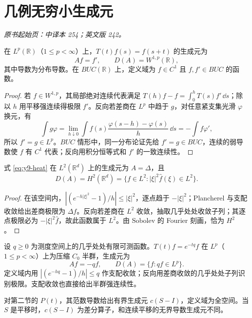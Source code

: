 \section{几例无穷小生成元}\label{sec:yosida-09-05}
\noindent\textit{原书起始页：中译本 254；英文版 242。}

\begin{proposition}[平移的生成元]\label{prop:y9-translation-generator}
在 $L^p(\mathbb R)$（$1\le p<\infty$）上，$T(t)f(s)=f(s+t)$ 的生成元为
\[
 Af=f',\qquad D(A)=W^{1,p}(\mathbb R),
\]
其中导数为分布导数。在 $BUC(\mathbb R)$ 上，定义域为 $f\in C^1$ 且 $f,f'\in BUC$ 的函数。
\end{proposition}
\begin{proof}
若 $f\in W^{1,p}$，其局部绝对连续代表满足
$T(h)f-f=\int_0^hT(s)f'\,\dd s$；除以 $h$ 用平移强连续得极限 $f'$。反向若差商在 $L^p$ 中趋于 $g$，对任意紧支集光滑 $\varphi$ 换元，有
\[
 \int g\varphi=\lim_{h\downarrow0}\int f(s)\frac{\varphi(s-h)-\varphi(s)}h\,\dd s
 =-\int f\varphi',
\]
所以 $f'=g\in L^p$。$BUC$ 情形中，同一分布论证先给 $f'=g\in BUC$，连续的弱导数使 $f$ 有 $C^1$ 代表；反向用积分恒等式和 $f'$ 的一致连续性。
\end{proof}

\begin{proposition}[热半群的最大定义域]\label{prop:y9-heat-generator}
式 \eqref{eq:y9-heat} 在 $L^2(\mathbb R^d)$ 上的生成元为 $A=\Delta$，且
\[
 D(A)=H^2(\mathbb R^d)=\{f\in L^2:|\xi|^2\widehat f(\xi)\in L^2\}.
\]
\end{proposition}
\begin{proof}
在该空间内，$|(e^{-h|\xi|^2}-1)/h|\le|\xi|^2$，逐点趋于 $-|\xi|^2$；Plancherel 与支配收敛给出差商极限为 $\Delta f$。反向若差商在 $L^2$ 收敛，抽取几乎处处收敛子列；其逐点极限必为 $-|\xi|^2\widehat f$，故此函数属于 $L^2$。由 Sobolev 的 Fourier 刻画，恰为 $H^2$。
\end{proof}

\begin{example}[乘法衰减与有界跳跃]
设 $q\ge0$ 为测度空间上的几乎处处有限可测函数。$T(t)f=e^{-tq}f$ 在 $L^p$（$1\le p<\infty$）上为压缩 $C_0$ 半群，生成元为
\[
 Af=-qf,\qquad D(A)=\{f:qf\in L^p\}.
\]
定义域内用 $|(e^{-hq}-1)/h|\le q$ 作支配收敛；反向用差商收敛的几乎处处子列识别极限。支配收敛也直接给出半群强连续性。

对第二节的 $P(t)$，其范数导数给出有界生成元 $c(S-I)$，定义域为全空间。当 $S$ 是平移时，$c(S-I)$ 为差分算子，和连续平移的无界导数生成元不同。
\end{example}


